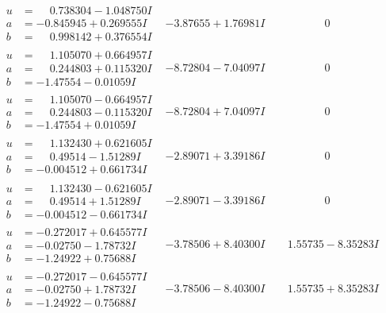 \documentclass[1p]{elsarticle_modified}
\theoremstyle{definition}
\begin{document}
$$\begin{array}{c|c|c}
\begin{aligned}
u &= \phantom{-}0.738304 - 1.048750 I \\
a &= -0.845945 + 0.269555 I \\
b &= \phantom{-}0.998142 + 0.376554 I\end{aligned}
 & -3.87655 + 1.76981 I & \phantom{-0.000000 } 0 \\ \hline\begin{aligned}
u &= \phantom{-}1.105070 + 0.664957 I \\
a &= \phantom{-}0.244803 + 0.115320 I \\
b &= -1.47554 - 0.01059 I\end{aligned}
 & -8.72804 - 7.04097 I & \phantom{-0.000000 } 0 \\ \hline\begin{aligned}
u &= \phantom{-}1.105070 - 0.664957 I \\
a &= \phantom{-}0.244803 - 0.115320 I \\
b &= -1.47554 + 0.01059 I\end{aligned}
 & -8.72804 + 7.04097 I & \phantom{-0.000000 } 0 \\ \hline\begin{aligned}
u &= \phantom{-}1.132430 + 0.621605 I \\
a &= \phantom{-}0.49514 - 1.51289 I \\
b &= -0.004512 + 0.661734 I\end{aligned}
 & -2.89071 + 3.39186 I & \phantom{-0.000000 } 0 \\ \hline\begin{aligned}
u &= \phantom{-}1.132430 - 0.621605 I \\
a &= \phantom{-}0.49514 + 1.51289 I \\
b &= -0.004512 - 0.661734 I\end{aligned}
 & -2.89071 - 3.39186 I & \phantom{-0.000000 } 0 \\ \hline\begin{aligned}
u &= -0.272017 + 0.645577 I \\
a &= -0.02750 - 1.78732 I \\
b &= -1.24922 + 0.75688 I\end{aligned}
 & -3.78506 + 8.40300 I & \phantom{-}1.55735 - 8.35283 I \\ \hline\begin{aligned}
u &= -0.272017 - 0.645577 I \\
a &= -0.02750 + 1.78732 I \\
b &= -1.24922 - 0.75688 I\end{aligned}
 & -3.78506 - 8.40300 I & \phantom{-}1.55735 + 8.35283 I \\ \hline\begin{aligned}

\end{aligned}
\end{array}$$
\end{document}
